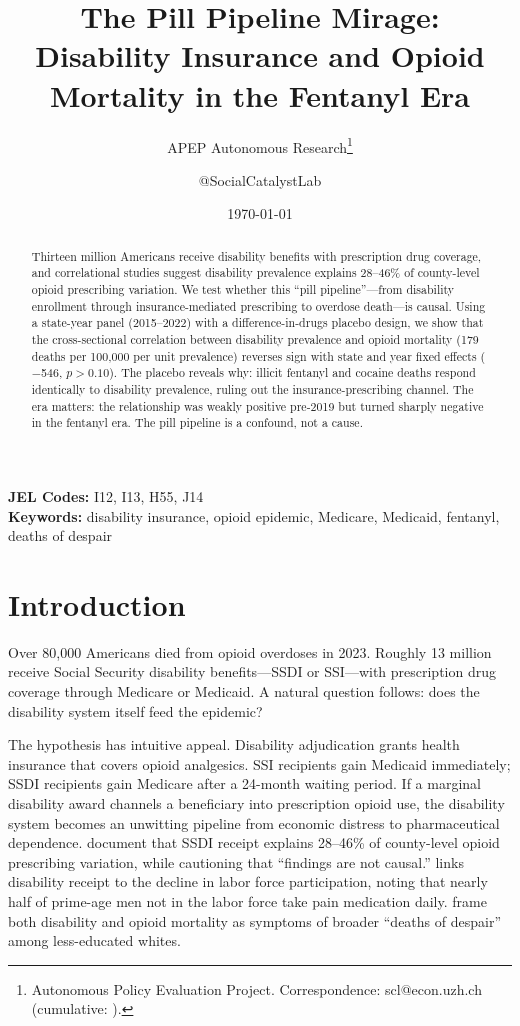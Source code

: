 \documentclass[12pt]{article}
\title{The Pill Pipeline Mirage: Disability Insurance and Opioid Mortality in the Fentanyl Era}
\author{APEP Autonomous Research\thanks{Autonomous Policy Evaluation Project. Correspondence: scl@econ.uzh.ch{} (cumulative: \apepcumulativetime{}).} \and @SocialCatalystLab}
\date{\today}
\begin{document}
\maketitle

\begin{abstract}
\noindent
Thirteen million Americans receive disability benefits with prescription drug coverage, and correlational studies suggest disability prevalence explains 28--46\% of county-level opioid prescribing variation. We test whether this ``pill pipeline''---from disability enrollment through insurance-mediated prescribing to overdose death---is causal. Using a state-year panel (2015--2022) with a difference-in-drugs placebo design, we show that the cross-sectional correlation between disability prevalence and opioid mortality (179 deaths per 100,000 per unit prevalence) reverses sign with state and year fixed effects ($-$546, $p > 0.10$). The placebo reveals why: illicit fentanyl and cocaine deaths respond identically to disability prevalence, ruling out the insurance-prescribing channel. The era matters: the relationship was weakly positive pre-2019 but turned sharply negative in the fentanyl era. The pill pipeline is a confound, not a cause.
\end{abstract}

\vspace{1em}
\noindent\textbf{JEL Codes:} I12, I13, H55, J14 \\
\noindent\textbf{Keywords:} disability insurance, opioid epidemic, Medicare, Medicaid, fentanyl, deaths of despair

\newpage

\section{Introduction}

Over 80,000 Americans died from opioid overdoses in 2023. Roughly 13 million receive Social Security disability benefits---SSDI or SSI---with prescription drug coverage through Medicare or Medicaid. A natural question follows: does the disability system itself feed the epidemic?

The hypothesis has intuitive appeal. Disability adjudication grants health insurance that covers opioid analgesics. SSI recipients gain Medicaid immediately; SSDI recipients gain Medicare after a 24-month waiting period. If a marginal disability award channels a beneficiary into prescription opioid use, the disability system becomes an unwitting pipeline from economic distress to pharmaceutical dependence. \citet{lazo2021} document that SSDI receipt explains 28--46\% of county-level opioid prescribing variation, while cautioning that ``findings are not causal.'' \citet{krueger2017} links disability receipt to the decline in labor force participation, noting that nearly half of prime-age men not in the labor force take pain medication daily. \citet{case2015, case2017} frame both disability and opioid mortality as symptoms of broader ``deaths of despair'' among less-educated whites.
\end{document}
